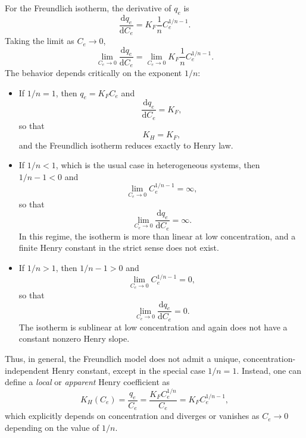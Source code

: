 	For the Freundlich isotherm, the derivative of \(q_e\) is
	\begin{equation}
		\frac{\mathrm{d} q_e}{\mathrm{d} C_e}
		= K_F \frac{1}{n} C_e^{1/n - 1}.
	\end{equation}
	Taking the limit as \(C_e \to 0\),
	\begin{equation}
		\lim_{C_e \to 0}
		\frac{\mathrm{d} q_e}{\mathrm{d} C_e}
		= \lim_{C_e \to 0}
		K_F \frac{1}{n} C_e^{1/n - 1}.
	\end{equation}
	The behavior depends critically on the exponent \(1/n\):
	
	\begin{itemize}
		\item If \(1/n = 1\), then \(q_e = K_F C_e\) and
		\begin{equation}
			\frac{\mathrm{d} q_e}{\mathrm{d} C_e} = K_F,
		\end{equation}
		so that
		\begin{equation}
			K_H = K_F,
		\end{equation}
		and the Freundlich isotherm reduces exactly to Henry law.
		
		\item If \(1/n < 1\), which is the usual case in heterogeneous
		systems, then \(1/n - 1 < 0\) and
		\begin{equation}
			\lim_{C_e \to 0} C_e^{1/n - 1} = \infty,
		\end{equation}
		so that
		\begin{equation}
			\lim_{C_e \to 0}
			\frac{\mathrm{d} q_e}{\mathrm{d} C_e} = \infty.
		\end{equation}
		In this regime, the isotherm is more than linear at low concentration,
		and a finite Henry constant in the strict sense does not exist.
		
		\item If \(1/n > 1\), then \(1/n - 1 > 0\) and
		\begin{equation}
			\lim_{C_e \to 0} C_e^{1/n - 1} = 0,
		\end{equation}
		so that
		\begin{equation}
			\lim_{C_e \to 0}
			\frac{\mathrm{d} q_e}{\mathrm{d} C_e} = 0.
		\end{equation}
		The isotherm is sublinear at low concentration and again does not
		have a constant nonzero Henry slope.
	\end{itemize}
	
	Thus, in general, the Freundlich model does not admit a unique,
	concentration-independent Henry constant, except in the special
	case \(1/n = 1\). Instead, one can define a \emph{local} or
	\emph{apparent} Henry coefficient as
	\begin{equation}
		K_H(C_e) = \frac{q_e}{C_e}
		= \frac{K_F C_e^{1/n}}{C_e}
		= K_F C_e^{1/n - 1},
	\end{equation}
	which explicitly depends on concentration and diverges or vanishes
	as \(C_e \to 0\) depending on the value of \(1/n\).
	
